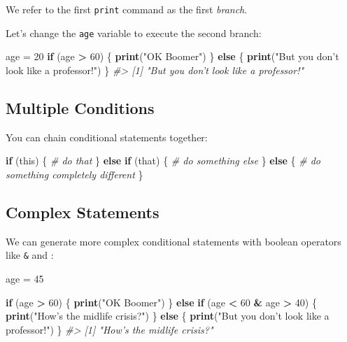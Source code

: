 \documentclass[]{book}
\newenvironment{Shaded}{\begin{snugshade}}{\end{snugshade}}
\newcommand{\CommentTok}[1]{\textcolor[rgb]{0.56,0.35,0.01}{\textit{#1}}}
\newcommand{\ControlFlowTok}[1]{\textcolor[rgb]{0.13,0.29,0.53}{\textbf{#1}}}
\newcommand{\DecValTok}[1]{\textcolor[rgb]{0.00,0.00,0.81}{#1}}
\newcommand{\KeywordTok}[1]{\textcolor[rgb]{0.13,0.29,0.53}{\textbf{#1}}}
\newcommand{\NormalTok}[1]{#1}
\newcommand{\OperatorTok}[1]{\textcolor[rgb]{0.81,0.36,0.00}{\textbf{#1}}}
\newcommand{\StringTok}[1]{\textcolor[rgb]{0.31,0.60,0.02}{#1}}
\begin{document}
We refer to the first \texttt{print} command as the first \emph{branch}.

Let's change the \texttt{age} variable to execute the second branch:

\begin{Shaded}
\begin{Highlighting}[]
\NormalTok{age =}\StringTok{ }\DecValTok{20}
\ControlFlowTok{if}\NormalTok{ (age }\OperatorTok{>}\StringTok{ }\DecValTok{60}\NormalTok{) \{}
    \KeywordTok{print}\NormalTok{(}\StringTok{"OK Boomer"}\NormalTok{)}
\NormalTok{\} }\ControlFlowTok{else}\NormalTok{ \{}
    \KeywordTok{print}\NormalTok{(}\StringTok{"But you don't look like a professor!"}\NormalTok{)}
\NormalTok{\}}
\CommentTok{#> [1] "But you don't look like a professor!"}
\end{Highlighting}
\end{Shaded}

\hypertarget{multiple-conditions}{%
\subsection{Multiple Conditions}\label{multiple-conditions}}

You can chain conditional statements together:

\begin{Shaded}
\begin{Highlighting}[]
\ControlFlowTok{if}\NormalTok{ (this) \{}
  \CommentTok{# do that}
\NormalTok{\} }\ControlFlowTok{else} \ControlFlowTok{if}\NormalTok{ (that) \{}
  \CommentTok{# do something else}
\NormalTok{\} }\ControlFlowTok{else}\NormalTok{ \{}
  \CommentTok{# do something completely different}
\NormalTok{\}}
\end{Highlighting}
\end{Shaded}

\hypertarget{complex-statements}{%
\subsection{Complex Statements}\label{complex-statements}}

We can generate more complex conditional statements with boolean operators like \texttt{\&} and \texttt{\textbar{}}:

\begin{Shaded}
\begin{Highlighting}[]
\NormalTok{age =}\StringTok{ }\DecValTok{45} 

\ControlFlowTok{if}\NormalTok{ (age }\OperatorTok{>}\StringTok{ }\DecValTok{60}\NormalTok{) \{}
    \KeywordTok{print}\NormalTok{(}\StringTok{"OK Boomer"}\NormalTok{)}
\NormalTok{\} }\ControlFlowTok{else} \ControlFlowTok{if}\NormalTok{ (age }\OperatorTok{<}\StringTok{ }\DecValTok{60} \OperatorTok{&}\StringTok{ }\NormalTok{age }\OperatorTok{>}\StringTok{ }\DecValTok{40}\NormalTok{) \{}
    \KeywordTok{print}\NormalTok{(}\StringTok{"How's the midlife crisis?"}\NormalTok{)}
\NormalTok{\} }\ControlFlowTok{else}\NormalTok{ \{}
    \KeywordTok{print}\NormalTok{(}\StringTok{"But you don't look like a professor!"}\NormalTok{)}
\NormalTok{\}}
\CommentTok{#> [1] "How's the midlife crisis?"}
\end{Highlighting}
\end{Shaded}
\end{document}

